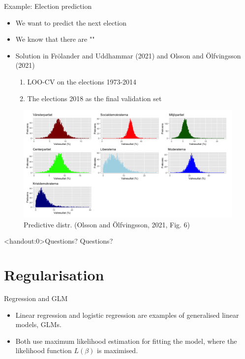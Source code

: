 \documentclass[10pt]{beamer}
\begin{document}
\begin{frame}{Example: Election prediction}

\begin{itemize}
\item We want to predict the next election
\item We know that there are ""
\item Solution in Frölander and Uddhammar (2021) and Olsson and Ölfvingsson (2021)
\begin{enumerate}
\item LOO-CV on the elections 1973-2014
\item The elections 2018 as the final validation set
\end{enumerate}


\end{itemize}

\begin{figure}[h]
\caption{Predictive distr. (Olsson and Ölfvingsson, 2021, Fig. 6)}
\centering
\includegraphics[width=1\textwidth]{figs/elections}
\end{figure}

\end{frame}

\begin{frame}<handout:0>{Questions?}
Questions?
\end{frame}


\section{Regularisation}
\frame{\sectionpage}

\begin{frame}{Regression and GLM}
\begin{itemize}
\item Linear regression and logistic regression are examples of {\color{uured}generalised linear models}, GLMs.\\[3mm]\pause
\item Both use maximum likelihood estimation for fitting the model, where the likelihood function $L(\beta)$ is maximised.
\end{itemize}
\end{frame}
\end{document}
